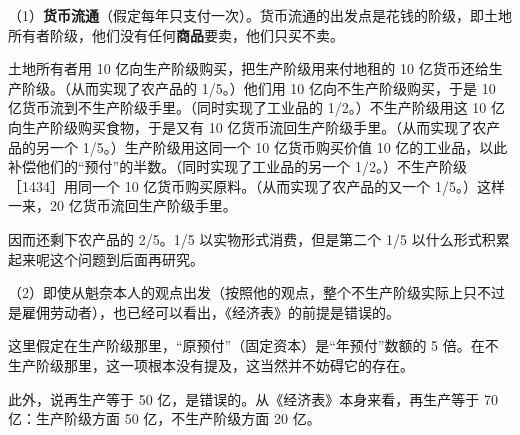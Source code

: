 （1）\textbf{货币流通}（假定每年只支付一次）。货币流通的出发点是花钱的阶级，即土地所有者阶级，他们没有任何\textbf{商品}要卖，他们只买不卖。

土地所有者用 10 亿向生产阶级购买，把生产阶级用来付地租的 10 亿货币还给生产阶级。（从而实现了农产品的 1/5。）他们用 10 亿向不生产阶级购买，于是 10 亿货币流到不生产阶级手里。（同时实现了工业品的 1/2。）不生产阶级用这 10 亿向生产阶级购买食物，于是又有 10 亿货币流回生产阶级手里。（从而实现了农产品的另一个 1/5。）生产阶级用这同一个 10 亿货币购买价值 10 亿的工业品，以此补偿他们的“预付”的半数。（同时实现了工业品的另一个 1/2。）不生产阶级［1434］用同一个 10 亿货币购买原料。（从而实现了农产品的又一个 1/5。）这样一来，20 亿货币流回生产阶级手里。

因而还剩下农产品的 2/5。1/5 以实物形式消费，但是第二个 1/5 以什么形式积累起来呢这个问题到后面再研究。

（2）即使从魁奈本人的观点出发（按照他的观点，整个不生产阶级实际上只不过是雇佣劳动者），也已经可以看出，《经济表》的前提是错误的。

这里假定在生产阶级那里，“原预付”（固定资本）是“年预付”数额的 5 倍。在不生产阶级那里，这一项根本没有提及，这当然并不妨碍它的存在。

此外，说再生产等于 50 亿，是错误的。从《经济表》本身来看，再生产等于 70 亿：生产阶级方面 50 亿，不生产阶级方面 20 亿。


